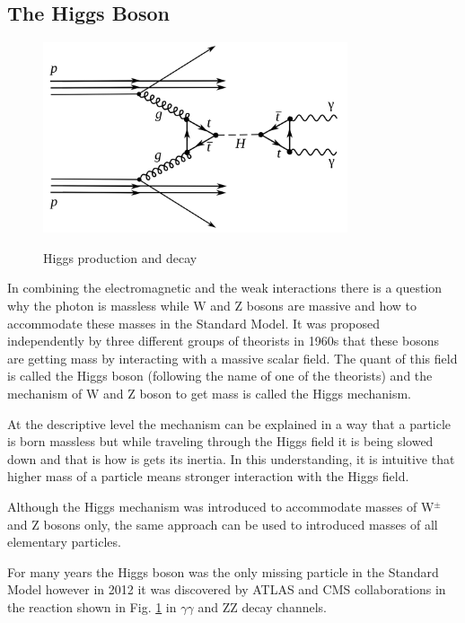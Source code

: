 \subsection{The Higgs Boson}
\label{Intro_Higgs}

\begin{figure}[htb]
  \begin{center}
    {\includegraphics[width=0.80\textwidth]{../figs/Intro/higgsProduction.png}}
    \caption{Higgs production and decay}
    \label{fig:higgsProduction}
  \end{center}
\end{figure}

In combining the electromagnetic and the weak interactions there is a question why the photon is massless while W and Z bosons are massive and how to accommodate these masses in the Standard Model. It was proposed independently by three different groups of theorists in 1960s that these bosons are getting mass by interacting with a massive scalar field. The quant of this field is called the Higgs boson (following the name of one of the theorists) and the mechanism of W and Z boson to get mass is called the Higgs mechanism. 

At the descriptive level the mechanism can be explained in a way that a particle is born massless but while traveling through the Higgs field it is being slowed down and that is how is gets its inertia. In this understanding, it is intuitive that higher mass of a particle means stronger interaction with the Higgs field. 

Although the Higgs mechanism was introduced to accommodate masses of W$^\pm$ and Z bosons only, the same approach can be used to introduced masses of all elementary particles.

For many years the Higgs boson was the only missing particle in the Standard Model however in 2012 it was discovered by ATLAS and CMS collaborations in the reaction shown in Fig. \ref{fig:higgsProduction} in $\gamma\gamma$ and ZZ decay channels. 

